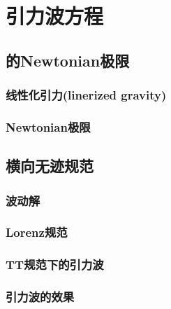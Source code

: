 
\chapter{引力波方程}
\label{chap2}

\section{\GR 的Newtonian极限}

\subsection{线性化引力(linerized gravity)}

\subsection{Newtonian极限}

\section{横向无迹规范}

\subsection{波动解}

\subsection{Lorenz规范}

\subsection{TT规范下的引力波}

\subsection{引力波的效果}
